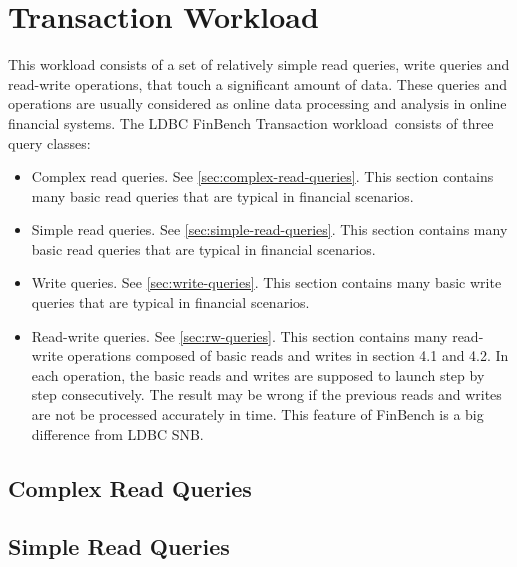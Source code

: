 \chapter{Transaction Workload}
\label{sec:transaction-workload}

This workload consists of a set of relatively simple read queries, write queries
and read-write operations, that touch a significant amount of data. These
queries and operations are usually considered as online data processing and
analysis in online financial systems. The LDBC FinBench Transaction workload\
consists of three query classes: 
\begin{itemize}
    \item Complex read queries. See \autoref{sec:complex-read-queries}. This section contains many basic read
    queries that are typical in financial scenarios.
    \item Simple read queries. See \autoref{sec:simple-read-queries}. This section contains many basic read
    queries that are typical in financial scenarios.
    \item Write queries. See \autoref{sec:write-queries}. This section contains many basic
    write queries that are typical in financial scenarios.
    \item Read-write queries. See \autoref{sec:rw-queries}. This section contains many
    read-write operations composed of basic reads and writes in section 4.1 and
    4.2. In each operation, the basic reads and writes are supposed to launch
    step by step consecutively. The result may be wrong if the previous reads
    and writes are not be processed accurately in time. This feature of FinBench
    is a big difference from LDBC SNB.
\end{itemize}

\section{Complex Read Queries}
\label{sec:complex-read-queries}




\section{Simple Read Queries}
\label{sec:simple-read-queries}

